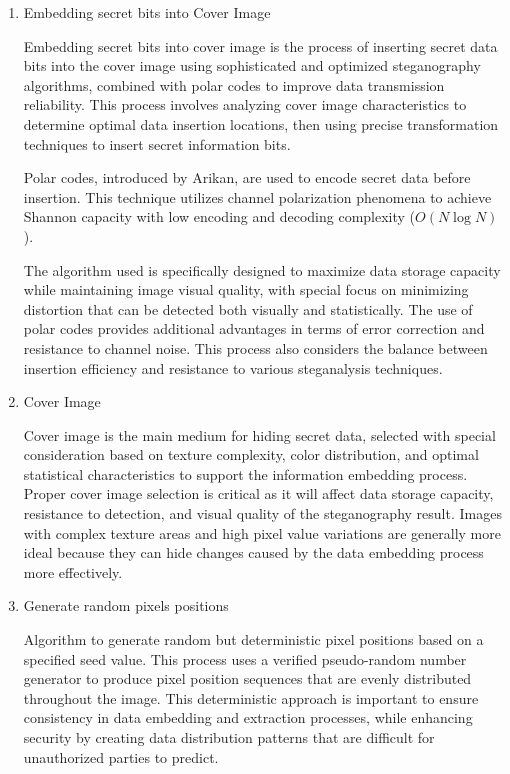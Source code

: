 \documentclass{ittelkom}
\begin{document}
\begin{enumerate}
    \item Embedding secret bits into Cover Image

          Embedding secret bits into cover image is the process of inserting secret data
          bits into the cover image using sophisticated and optimized steganography
          algorithms, combined with polar codes to improve data transmission reliability.
          This process involves analyzing cover image characteristics to determine
          optimal data insertion locations, then using precise transformation techniques
          to insert secret information bits.

          Polar codes, introduced by Arikan, are used to encode secret data before
          insertion. This technique utilizes channel polarization phenomena to achieve
          Shannon capacity with low encoding and decoding complexity ($O(N \log N)$).

          The algorithm used is specifically designed to maximize data storage capacity
          while maintaining image visual quality, with special focus on minimizing
          distortion that can be detected both visually and statistically. The use of
          polar codes provides additional advantages in terms of error correction and
          resistance to channel noise. This process also considers the balance between
          insertion efficiency and resistance to various steganalysis techniques.

    \item Cover Image

          Cover image is the main medium for hiding secret data, selected with special
          consideration based on texture complexity, color distribution, and optimal
          statistical characteristics to support the information embedding process.
          Proper cover image selection is critical as it will affect data storage
          capacity, resistance to detection, and visual quality of the steganography
          result. Images with complex texture areas and high pixel value variations are
          generally more ideal because they can hide changes caused by the data embedding
          process more effectively.

    \item Generate random pixels positions

          Algorithm to generate random but deterministic pixel positions based on a
          specified seed value. This process uses a verified pseudo-random number
          generator to produce pixel position sequences that are evenly distributed
          throughout the image. This deterministic approach is important to ensure
          consistency in data embedding and extraction processes, while enhancing
          security by creating data distribution patterns that are difficult for
          unauthorized parties to predict.


\end{enumerate}
\end{document}
